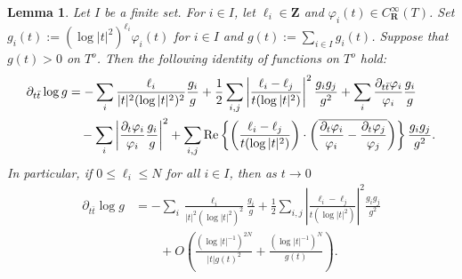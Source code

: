 \documentclass[amscd, leqno]{amsart}
\theoremstyle{plain}
\newtheorem{lemma}[theorem]{Lemma}
\theoremstyle{definition}
\theoremstyle{remark}
\begin{document}


\begin{lemma}
\label{lemma:technical}
Let $I$ be a finite set. For $i\in I$, let $\ell_{i}\in{\mathbf Z}$ and $\varphi_{i}(t)\in C^{\infty}_{\mathbf R}(T)$. 
Set $g_{i}(t) := (\log|t|^{2})^{\ell_{i}}\varphi_{i}(t)$ for $i\in I$ and $g(t) := \sum_{i\in I} g_{i}(t)$. Suppose that $g(t)>0$ on $T^{o}$.
Then the following identity of functions on $T^{o}$ hold:
\begin{equation}
\label{eqn:dd:log:g}
\begin{aligned}
\partial_{t\bar{t}}\log g
&=
-\sum_{i}\frac{\ell_{i}}{|t|^{2}(\log|t|^{2})^{2}} \frac{g_{i}}{g}
+
\frac{1}{2}\sum_{i,j}  \left| \frac{\ell_{i}-\ell_{j}}{t(\log|t|^{2})}  \right|^{2} \frac{g_{i}g_{j}}{g^{2}}
+
\sum_{i} \frac{\partial_{t\bar{t}}\varphi_{i}}{\varphi_{i}} \frac{g_{i}}{g}
\\
&\quad
-
\sum_{i} \left| \frac{\partial_{t}\varphi_{i}}{\varphi_{i}} \frac{g_{i}}{g} \right|^{2}
+
\sum_{i,j} {\rm Re}\left\{ \left( \frac{\ell_{i}-\ell_{j}}{t(\log|t|^{2})}\right) \cdot
\left(\overline{\frac{\partial_{t}\varphi_{i}}{\varphi_{i}}-\frac{\partial_{t}\varphi_{j}}{\varphi_{j}}}\right) \right\} \frac{g_{i}g_{j}}{g^{2}}.
\end{aligned}
\end{equation}
In particular, if $0\leq \ell_{i}\leq N$ for all $i\in I$, then as $t\to0$
\begin{equation}
\label{eqn:d:log:g:asymp}
\begin{aligned}
\partial_{t\bar{t}}\log g
&=
-\sum_{i}\frac{\ell_{i}}{|t|^{2}(\log|t|^{2})^{2}} \frac{g_{i}}{g}
+
\frac{1}{2}\sum_{i,j}  \left| \frac{\ell_{i}-\ell_{j}}{t(\log|t|^{2})} \right|^{2} \frac{g_{i}g_{j}}{g^{2}}
\\
&\qquad
+
O\left( \frac{(\log |t|^{-1})^{2N}}{|t| g(t)^{2}} + \frac{(\log |t|^{-1})^{N}}{g(t)} \right).
\end{aligned}
\end{equation}
\end{lemma}
\end{document}
